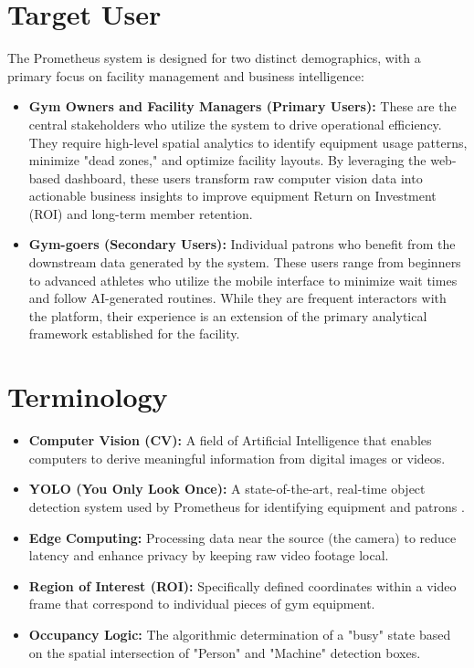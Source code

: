 \section{Target User}
\label{section:target-user}
The Prometheus system is designed for two distinct demographics, with a primary focus on facility management and business intelligence:

\begin{itemize}
    \item \textbf{Gym Owners and Facility Managers (Primary Users):} These are the central stakeholders 
    who utilize the system to drive operational efficiency. They require high-level spatial analytics to 
    identify equipment usage patterns, minimize "dead zones," and optimize facility layouts. By leveraging 
    the web-based dashboard, these users transform raw computer vision data into actionable business insights 
    to improve equipment Return on Investment (ROI) and long-term member retention.
    \item \textbf{Gym-goers (Secondary Users):} Individual patrons who benefit from the downstream data 
    generated by the system. These users range from beginners to advanced athletes who utilize the mobile 
    interface to minimize wait times and follow AI-generated routines. While they are frequent interactors 
    with the platform, their experience is an extension of the primary analytical framework established for 
    the facility.
\end{itemize}

\section{Terminology}
\label{section:terminology}
\begin{itemize}
    \item \textbf{Computer Vision (CV):} A field of Artificial Intelligence that enables computers to derive meaningful information from digital images or videos.
    \item \textbf{YOLO (You Only Look Once):} A state-of-the-art, real-time object detection system used by Prometheus for identifying equipment and patrons \cite{ultralytics:yolov8}.
    \item \textbf{Edge Computing:} Processing data near the source (the camera) to reduce latency and enhance privacy by keeping raw video footage local.
    \item \textbf{Region of Interest (ROI):} Specifically defined coordinates within a video frame that correspond to individual pieces of gym equipment.
    \item \textbf{Occupancy Logic:} The algorithmic determination of a "busy" state based on the spatial intersection of "Person" and "Machine" detection boxes.
\end{itemize}